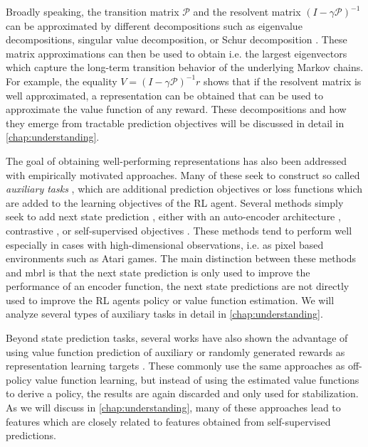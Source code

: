 Broadly speaking, the transition matrix $\mathcal{P}$ and the resolvent matrix $(I - \gamma \mathcal{P})^{-1}$ can be approximated by different decompositions such as eigenvalue decompositions, singular value decomposition, or Schur decomposition \parencite{ghosh2020representations}.
These matrix approximations can then be used to obtain i.e. the largest eigenvectors which capture the long-term transition behavior of the underlying Markov chains.
For example, the equality $V = (I - \gamma \mathcal{P})^{-1} r$ shows that if the resolvent matrix is well approximated, a representation can be obtained that can be used to approximate the value function of any reward.
These decompositions and how they emerge from tractable prediction objectives will be discussed in detail in \autoref{chap:understanding}.

The goal of obtaining well-performing representations has also been addressed with empirically motivated approaches.
Many of these seek to construct so called \emph{auxiliary tasks} \parencite{jaderberg2017reinforcement}, which are additional prediction objectives or loss functions which are added to the learning objectives of the RL agent.
Several methods simply seek to add next state prediction , either with an auto-encoder architecture \parencite{jaderberg2017reinforcement}, contrastive \parencite{laskin2020contrastive}, or self-supervised objectives \parencite{gelada2019deepmdp,schwarzer2021dataefficient,schwarzer2021pretraining,tang2022understanding}.
These methods tend to perform well especially in cases with high-dimensional observations, i.e. as pixel based environments such as Atari games.
The main distinction between these methods and \ac{mbrl} is that the next state prediction is only used to improve the performance of an encoder function, the next state predictions are not directly used to improve the RL agents policy or value function estimation.
We will analyze several types of auxiliary tasks in detail in \autoref{chap:understanding}.

Beyond state prediction tasks, several works have also shown the advantage of using value function prediction of auxiliary or randomly generated rewards as representation learning targets \parencite{lyle2021effect,farebrother2023protovalue}.
These commonly use the same approaches as off-policy value function learning, but instead of using the estimated value functions to derive a policy, the results are again discarded and only used for stabilization.
As we will discuss in \autoref{chap:understanding}, many of these approaches lead to features which are closely related to features obtained from self-supervised predictions.

